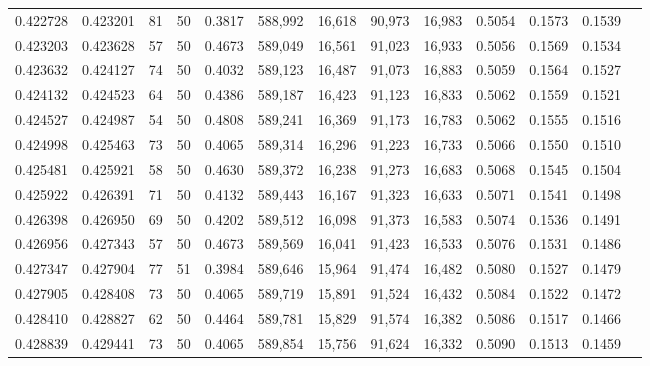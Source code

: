 \begin{tabular}{rrrrrrrrrrrrr}
0.422728 & 0.423201 &    81 &  50 &                                     0.3817 & 588,992 &  16,618 &  90,973 &  16,983 & 0.5054 & 0.1573 & 0.1539 \\
0.423203 & 0.423628 &    57 &  50 &                                     0.4673 & 589,049 &  16,561 &  91,023 &  16,933 & 0.5056 & 0.1569 & 0.1534 \\
0.423632 & 0.424127 &    74 &  50 &                                     0.4032 & 589,123 &  16,487 &  91,073 &  16,883 & 0.5059 & 0.1564 & 0.1527 \\
0.424132 & 0.424523 &    64 &  50 &                                     0.4386 & 589,187 &  16,423 &  91,123 &  16,833 & 0.5062 & 0.1559 & 0.1521 \\
0.424527 & 0.424987 &    54 &  50 &                                     0.4808 & 589,241 &  16,369 &  91,173 &  16,783 & 0.5062 & 0.1555 & 0.1516 \\
0.424998 & 0.425463 &    73 &  50 &                                     0.4065 & 589,314 &  16,296 &  91,223 &  16,733 & 0.5066 & 0.1550 & 0.1510 \\
0.425481 & 0.425921 &    58 &  50 &                                     0.4630 & 589,372 &  16,238 &  91,273 &  16,683 & 0.5068 & 0.1545 & 0.1504 \\
0.425922 & 0.426391 &    71 &  50 &                                     0.4132 & 589,443 &  16,167 &  91,323 &  16,633 & 0.5071 & 0.1541 & 0.1498 \\
0.426398 & 0.426950 &    69 &  50 &                                     0.4202 & 589,512 &  16,098 &  91,373 &  16,583 & 0.5074 & 0.1536 & 0.1491 \\
0.426956 & 0.427343 &    57 &  50 &                                     0.4673 & 589,569 &  16,041 &  91,423 &  16,533 & 0.5076 & 0.1531 & 0.1486 \\
0.427347 & 0.427904 &    77 &  51 &                                     0.3984 & 589,646 &  15,964 &  91,474 &  16,482 & 0.5080 & 0.1527 & 0.1479 \\
0.427905 & 0.428408 &    73 &  50 &                                     0.4065 & 589,719 &  15,891 &  91,524 &  16,432 & 0.5084 & 0.1522 & 0.1472 \\
0.428410 & 0.428827 &    62 &  50 &                                     0.4464 & 589,781 &  15,829 &  91,574 &  16,382 & 0.5086 & 0.1517 & 0.1466 \\
0.428839 & 0.429441 &    73 &  50 &                                     0.4065 & 589,854 &  15,756 &  91,624 &  16,332 & 0.5090 & 0.1513 & 0.1459 \\

\end{tabular}
